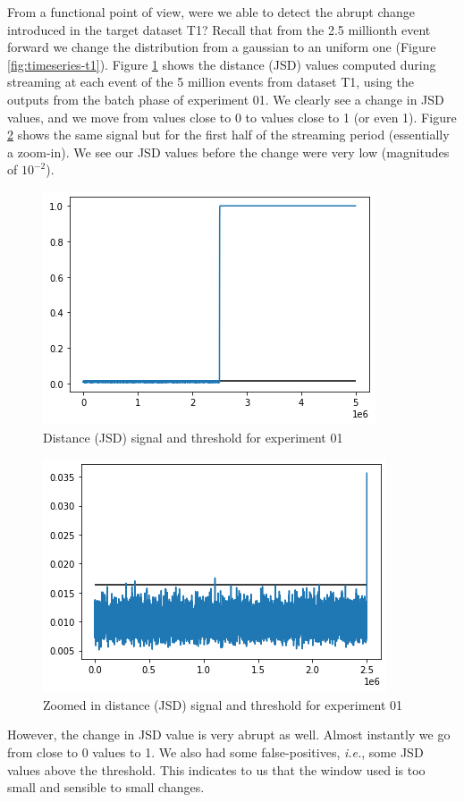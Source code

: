 From a functional point of view, were we able to detect the abrupt change introduced in the target dataset T1? Recall that from the 2.5 millionth event forward we change the distribution from a gaussian to an uniform one (Figure \ref{fig:timeseries-t1}). Figure \ref{fig:JSD-signal-01} shows the distance (JSD) values computed during streaming at each event of the 5 million events from dataset T1, using the outputs from the batch phase of experiment 01. We clearly see a change in JSD values, and we move from values close to 0 to values close to 1 (or even 1). Figure \ref{fig:JSD-signal-zoom-01} shows the same signal but for the first half of the streaming period (essentially a zoom-in). We see our JSD values before the change were very low (magnitudes of $10^{-2}$).
\begin{figure}[!htb]
    \begin{center}
      \includegraphics[scale=0.6]{figures/stream-analysis-viz-625.png}
      \caption[]{Distance (JSD) signal and threshold for experiment 01}
      \label{fig:JSD-signal-01}
    \end{center}
\end{figure}
\begin{figure}[!htb]
    \begin{center}
      \includegraphics[scale=0.6]{figures/stream-analysis-viz-zoom-625.png}
      \caption[]{Zoomed in distance (JSD) signal and threshold for experiment 01}
      \label{fig:JSD-signal-zoom-01}
    \end{center}
\end{figure}
However, the change in JSD value is very abrupt as well. Almost instantly we go from close to 0 values to 1. We also had some false-positives, \textit{i.e.}, some JSD values above the threshold. This indicates to us that the window used is too small and sensible to small changes.

